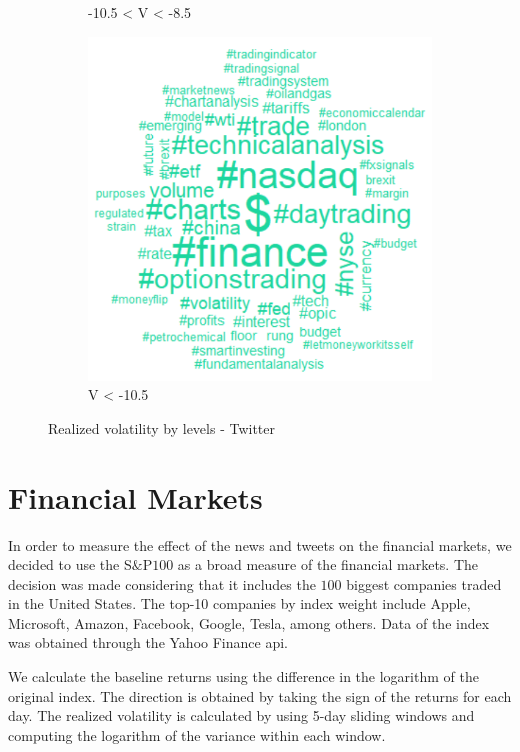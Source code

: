 \documentclass[a4paper, 12pt]{report}
\begin{document}
\begin{figure}[H]
\begin{subfigure}[t]{.32\textwidth}
        \caption{-10.5 < V < -8.5}
        \label{Fig:var_wcloud_twt2}
    \end{subfigure}
    \begin{subfigure}[t]{.32\textwidth}
        \centering
        \includegraphics[width=\textwidth]{graphs/Twitter/var_wcloud_twt3.png}
        \caption{V < -10.5}
        \label{Fig:var_wcloud_twt3}
    \end{subfigure}
    \caption{Realized volatility by levels - Twitter}
    \label{Fig:var_levels_tw}
    \end{figure}
    
    \section{Financial Markets}
    
    In order to measure the effect of the news and tweets on the financial markets, we decided to use the S$\&$P$100$ as a broad measure of the financial markets. The decision was made considering that it includes the $100$ biggest companies traded in the United States. The top-10 companies by index weight include Apple, Microsoft, Amazon, Facebook, Google, Tesla, among others. Data of the index was obtained through the Yahoo Finance api.  
    
    We calculate the baseline returns using the difference in the logarithm of the original index. The direction is obtained by taking the sign of the returns for each day. The realized volatility is calculated by using 5-day sliding windows and computing the logarithm of the variance within each window. 
    
\end{document}
